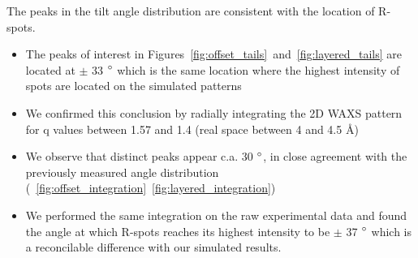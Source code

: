 \documentclass{article}
\begin{document}
  The peaks in the tilt angle distribution are consistent with the location of R-spots.
  \begin{itemize}
	\item The peaks of interest in Figures~\ref{fig:offset_tails}~and~\ref{fig:layered_tails}
	are located at $\pm$ 33 $\degree$ which is the same location where the highest intensity
	of spots are located on the simulated patterns
	\item We confirmed this conclusion by radially integrating the 2D WAXS pattern for q values
	between 1.57 and 1.4 (real space between 4 and 4.5 \AA) 
	\item We observe that distinct peaks appear c.a. 30 $\degree$, in close agreement with the
	previously measured angle distribution (~\ref{fig:offset_integration}~\ref{fig:layered_integration})
	\item We performed the same integration on the raw experimental data and found the angle
	at which R-spots reaches its highest intensity to be $\pm$ 37 $\degree$ which is a 
	reconcilable difference with our simulated results.  
  \end{itemize}
\end{document}
